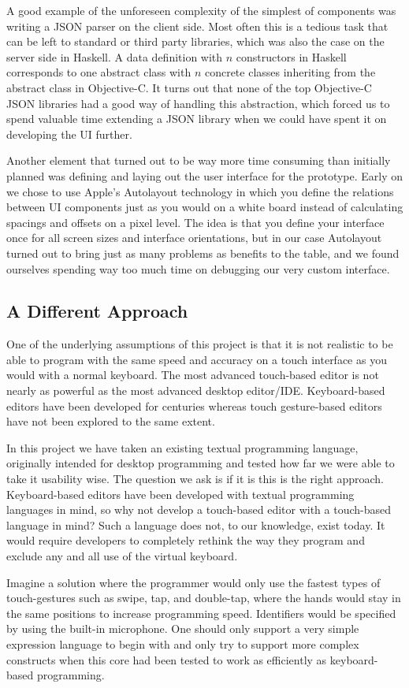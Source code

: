 A good example of the unforeseen complexity of the simplest of components was writing a JSON parser on the client side. Most often this is a tedious task that can be left to standard or third party libraries, which was also the case on the server side in Haskell. A data definition with $n$ constructors in Haskell corresponds to one abstract class with $n$ concrete classes inheriting from the abstract class in Objective-C. It turns out that none of the top Objective-C JSON libraries had a good way of handling this abstraction, which forced us to spend valuable time extending a JSON library when we could have spent it on developing the UI further.

Another element that turned out to be way more time consuming than initially planned was defining and laying out the user interface for the prototype. Early on we chose to use Apple's Autolayout technology in which you define the relations between UI components just as you would on a white board instead of calculating spacings and offsets on a pixel level. The idea is that you define your interface once for all screen sizes and interface orientations, but in our case Autolayout turned out to bring just as many problems as benefits to the table, and we found ourselves spending way too much time on debugging our very custom interface.

\subsection{A Different Approach}
One of the underlying assumptions of this project is that it is not realistic to be able to program with the same speed and accuracy on a touch interface as you would with a normal keyboard. The most advanced touch-based editor is not nearly as powerful as the most advanced desktop editor/IDE. Keyboard-based editors have been developed for centuries whereas touch gesture-based editors have not been explored to the same extent. 

In this project we have taken an existing textual programming language, originally intended for desktop programming and tested how far we were able to take it usability wise. The question we ask is if it is this is the right approach. Keyboard-based editors have been developed with textual programming languages in mind, so why not develop a touch-based editor with a touch-based language in mind? Such a language does not, to our knowledge, exist today. It would require developers to completely rethink the way they program and exclude any and all use of the virtual keyboard.

Imagine a solution where the programmer would only use the fastest types of touch-gestures such as swipe, tap, and double-tap, where the hands would stay in the same positions to increase programming speed. Identifiers would be specified by using the built-in microphone. One should only support a very simple expression language to begin with and only try to support more complex constructs when this core had been tested to work as efficiently as keyboard-based programming.

